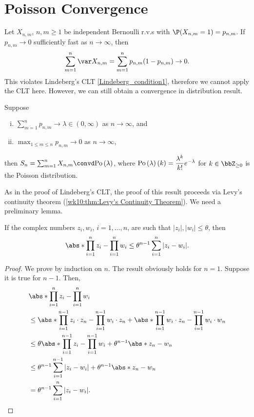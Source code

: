 \documentclass[../aipt.tex]{subfiles}
\begin{document}
\section{Poisson Convergence}

Let $X_{n,m}$, $n,m\geq 1$ be independent Bernoulli r.v.s with $\P(X_{n,m}=1)=p_{n,m}$. If $p_{n,m} \to 0$ sufficiently fast as $n\to\infty$, then
\begin{align*}
\sum_{m=1}^n \var X_{n,m} = \sum_{m=1}^n p_{n,m}(1-p_{n,m}) \to 0.
\end{align*}
This violates Lindeberg's CLT \cref{Lindeberg_condition1}, therefore we cannot apply the CLT here. However, we can still obtain a convergence in distribution result.

\begin{Theorem}\label{wk11:thm:Poisson convergence}
Suppose 
\begin{enumerate}[(i)]
	\item $\sum_{m=1}^n p_{n,m} \to \lambda \in (0,\infty)$ as $n\to\infty$, and
	\item $\max_{1\leq m\leq n} p_{n,m} \to 0$ as $n\to\infty$,
\end{enumerate}
then $S_n = \sum_{m=1}^n X_{n,m} \convd \Po{\lambda}$, where $\mathrm{Po}\left(\lambda\right)(k)= \dfrac{\lambda^k}{k!} e^{-\lambda}$ for $k\in\bbZ_{\geq0}$ is the Poisson distribution.
\end{Theorem} 
As in the proof of Lindeberg's CLT, the proof of this result proceeds via Levy's continuity theorem (\cref{wk10:thm:Levy's Continuity Theorem}). We need a preliminary lemma.

\begin{Lemma}\label{wk11:lem:prodbound}
If the complex numbers $z_i, w_i$, $i=1,\ldots,n$, are such that $|z_i|, |w_i| \leq \theta$, then
\begin{align*}
\abs*{\prod_{i=1}^n z_i - \prod_{i=1}^n w_i} \leq \theta^{n-1} \sum_{i=1}^n |z_i-w_i|.
\end{align*}
\end{Lemma}
\begin{proof}
We prove by induction on $n$. The result obviously holds for $n=1$. Suppose it is true for $n-1$. Then,
\begin{align*}
& \abs*{\prod_{i=1}^n z_i - \prod_{i=1}^n w_i} \\
& \leq \abs*{\prod_{i=1}^{n-1} z_i \cdot z_n - \prod_{i=1}^{n-1} w_i \cdot z_n} + \abs*{\prod_{i=1}^{n-1} w_i \cdot z_n - \prod_{i=1}^{n-1} w_i \cdot w_n} \\
& \leq \theta \abs*{\prod_{i=1}^{n-1} z_i - \prod_{i=1}^{n-1} w_i} + \theta^{n-1} \abs*{z_n - w_n} \\
& \leq \theta^{n-1} \sum_{i=1}^{n-1} |z_i-w_i| + \theta^{n-1} \abs*{z_n - w_n} \\
& = \theta^{n-1} \sum_{i=1}^n |z_i-w_i|.
\end{align*}
\end{proof}
\end{document}
